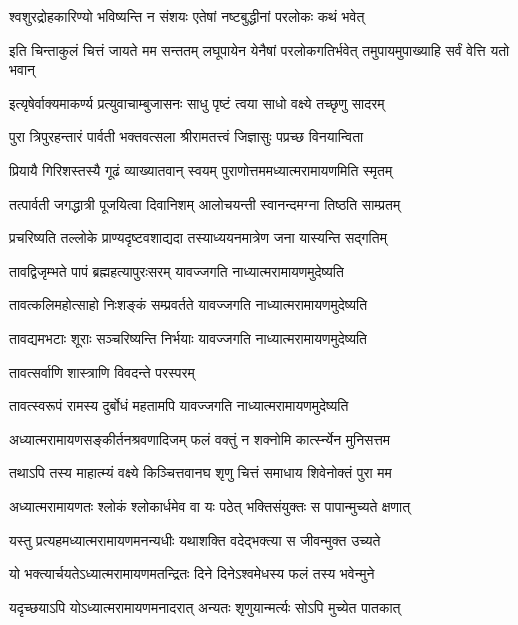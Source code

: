 \twolineshloka
{श्वशुरद्रोहकारिण्यो भविष्यन्ति न संशयः}
{एतेषां नष्टबुद्धीनां परलोकः कथं भवेत्} %

\threelineshloka
{इति चिन्ताकुलं चित्तं जायते मम सन्ततम्}
{लघूपायेन येनैषां परलोकगतिर्भवेत्}
{तमुपायमुपाख्याहि सर्वं वेत्ति यतो भवान्} %

\twolineshloka
{इत्यृषेर्वाक्यमाकर्ण्य प्रत्युवाचाम्बुजासनः}
{साधु पृष्टं त्वया साधो वक्ष्ये तच्छृणु सादरम्} %

\twolineshloka
{पुरा त्रिपुरहन्तारं पार्वती भक्तवत्सला}
{श्रीरामतत्त्वं जिज्ञासुः पप्रच्छ विनयान्विता} %

\twolineshloka
{प्रियायै गिरिशस्तस्यै गूढं व्याख्यातवान् स्वयम्}
{पुराणोत्तममध्यात्मरामायणमिति स्मृतम्} %

\twolineshloka
{तत्पार्वती जगद्धात्री पूजयित्वा दिवानिशम्}
{आलोचयन्ती स्वानन्दमग्ना तिष्ठति साम्प्रतम्} %

\twolineshloka
{प्रचरिष्यति तल्लोके प्राण्यदृष्टवशाद्यदा}
{तस्याध्ययनमात्रेण जना यास्यन्ति सद्गतिम्} %

\twolineshloka
{तावद्विजृम्भते पापं ब्रह्महत्यापुरःसरम्}
{यावज्जगति नाध्यात्मरामायणमुदेष्यति} %

\twolineshloka
{तावत्कलिमहोत्साहो निःशङ्कं सम्प्रवर्तते}
{यावज्जगति नाध्यात्मरामायणमुदेष्यति} %

\twolineshloka
{तावद्यमभटाः शूराः सञ्चरिष्यन्ति निर्भयाः}
{यावज्जगति नाध्यात्मरामायणमुदेष्यति} %

\onelineshloka
{तावत्सर्वाणि शास्त्राणि विवदन्ते परस्परम्} %

\twolineshloka
{तावत्स्वरूपं रामस्य दुर्बोधं महतामपि}
{यावज्जगति नाध्यात्मरामायणमुदेष्यति} %

\twolineshloka
{अध्यात्मरामायणसङ्कीर्तनश्रवणादिजम्}
{फलं वक्तुं न शक्नोमि कार्त्स्न्येन मुनिसत्तम} %

\twolineshloka
{तथाऽपि तस्य माहात्म्यं वक्ष्ये किञ्चित्तवानघ}
{शृणु चित्तं समाधाय शिवेनोक्तं पुरा मम} %

\twolineshloka
{अध्यात्मरामायणतः श्लोकं श्लोकार्धमेव वा}
{यः पठेत् भक्तिसंयुक्तः स पापान्मुच्यते क्षणात्} %

\twolineshloka
{यस्तु प्रत्यहमध्यात्मरामायणमनन्यधीः}
{यथाशक्ति वदेद्भक्त्या स जीवन्मुक्त उच्यते} %

\twolineshloka
{यो भक्त्यार्चयतेऽध्यात्मरामायणमतन्द्रितः}
{दिने दिनेऽश्वमेधस्य फलं तस्य भवेन्मुने} %

\twolineshloka
{यदृच्छयाऽपि योऽध्यात्मरामायणमनादरात्}
{अन्यतः शृणुयान्मर्त्यः सोऽपि मुच्येत पातकात्} %

